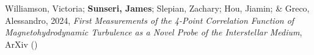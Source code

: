 \item Williamson, Victoria; \textbf{Sunseri, James}; Slepian, Zachary; Hou, Jiamin; \& Greco, Alessandro, 2024, \emph{First Measurements of the 4-Point Correlation Function of Magnetohydrodynamic Turbulence as a Novel Probe of the Interstellar Medium}, ArXiv ()